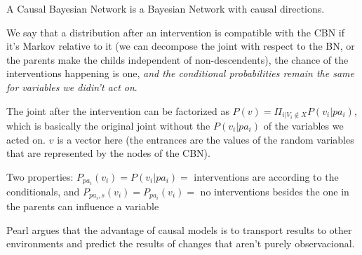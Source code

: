 A Causal Bayesian Network is a Bayesian Network with causal directions.

We say that a distribution after an intervention is compatible with the CBN if it's Markov relative to it (we can decompose the joint with respect to the BN, or the parents make the childs independent of non-descendents), the chance of the interventions happening is one, \textit{and the conditional probabilities remain the same for variables we didin't act on}.

The joint after the intervention can be factorized as $P(v) = \Pi_{i|V_i \notin X} P(v_i|pa_i)$, which is basically the original joint without the $P(v_i|pa_i)$ of the variables we acted on. $v$ is a vector here (the entrances are the values of the random variables that are represented by the nodes of the CBN).

Two properties: $P_{pa_i}(v_i) = P(v_i|pa_i) = $ interventions are according to the conditionals, and $P_{pa_i,s}(v_i) = P_{pa_i}(v_i) = $ no interventions besides the one in the parents can influence a variable

Pearl argues that the advantage of causal models is to transport results to other environments and predict the results of changes that aren't purely observacional.
